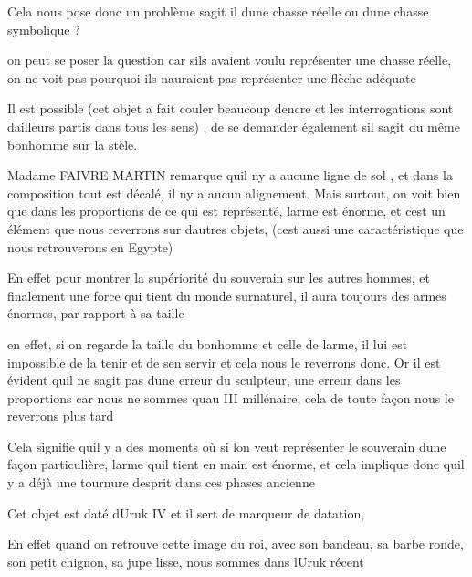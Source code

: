 \documentclass{article}
\begin{document}
Cela nous pose donc un problème  s{\textquotesingle}agit il
d{\textquotesingle}une chasse réelle ou d{\textquotesingle}une chasse
symbolique ?

on peut se poser la question car s{\textquotesingle}ils avaient voulu
représenter une chasse réelle, on ne voit pas pourquoi ils
n{\textquotesingle}auraient pas représenter une flèche adéquate

Il est possible (cet objet a fait couler beaucoup
d{\textquotesingle}encre et les interrogations sont
d{\textquotesingle}ailleurs partis dans tous les  sens) , de se
demander également s{\textquotesingle}il s{\textquotesingle}agit du
même bonhomme sur la stèle.

Madame FAIVRE MARTIN remarque qu{\textquotesingle}il
n{\textquotesingle}y a aucune ligne de sol , et dans la composition
tout est décalé, il n{\textquotesingle}y a aucun alignement. Mais
surtout, on voit bien que dans les proportions de ce qui est
représenté, l{\textquotesingle}arme est énorme, et
c{\textquotesingle}est un élément que nous reverrons sur
d{\textquotesingle}autres objets,  (c{\textquotesingle}est aussi une
caractéristique que nous retrouverons en Egypte)

En effet pour montrer la supériorité du souverain sur les autres hommes,
et finalement une force qui tient du monde surnaturel, il aura toujours
des armes énormes, par rapport à sa taille 

en effet, si on regarde la taille du bonhomme et celle de
l{\textquotesingle}arme, il lui est impossible de la tenir et de
s{\textquotesingle}en servir et cela  nous le reverrons donc. Or il est
évident qu{\textquotesingle}il ne s{\textquotesingle}agit pas
d{\textquotesingle}une erreur du sculpteur, une erreur dans les
proportions car nous ne sommes qu{\textquotesingle}au III millénaire,
cela de toute façon nous le reverrons plus tard

Cela signifie qu{\textquotesingle}il y a des moments où si
l{\textquotesingle}on veut représenter le souverain
d{\textquotesingle}une façon particulière, l{\textquotesingle}arme
qu{\textquotesingle}il tient en main est énorme, et cela implique donc
qu{\textquotesingle}il y a déjà une tournure d{\textquotesingle}esprit
dans ces phases ancienne

Cet objet est daté d{\textquotesingle}Uruk IV et il sert de marqueur de
datation, 

En effet quand on retrouve cette  image du roi, avec son bandeau, sa
barbe ronde, son petit chignon, sa jupe lisse, nous sommes dans
l{\textquotesingle}Uruk récent
\end{document}
